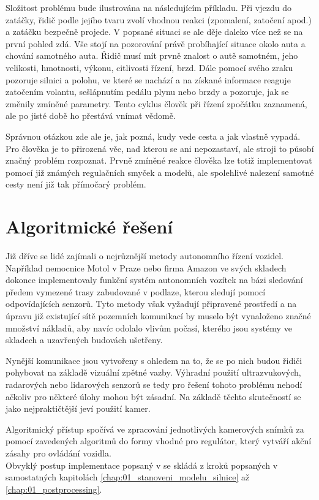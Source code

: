 \documentclass[czech, bc, kky, he, iso690numb]{fasthesis}
\begin{document}
        Složitost problému bude ilustrována na následujícím příkladu. Při vjezdu do zatáčky, řidič podle jejího tvaru zvolí vhodnou reakci (zpomalení, zatočení apod.) a zatáčku bezpečně projede. V popsané situaci se ale děje daleko více než se na první pohled zdá. Vše stojí na pozorování právě probíhající situace okolo auta a chování samotného auta. Řidič musí mít prvně znalost o autě samotném, jeho velikosti, hmotnosti, výkonu, citlivosti řízení, brzd. Dále pomocí svého zraku pozoruje silnici a polohu, ve které se nachází a na získané informace reaguje zatočením volantu, sešlápnutím pedálu plynu nebo brzdy a pozoruje, jak se změnily zmíněné parametry. Tento cyklus člověk při řízení zpočátku zaznamená, ale po jisté době ho přestává vnímat vědomě.
        
        Správnou otázkou zde ale je, jak pozná, kudy vede cesta a jak vlastně vypadá. Pro člověka je to přirozená věc, nad kterou se ani nepozastaví, ale stroji to působí značný problém rozpoznat. Prvně zmíněné reakce člověka lze totiž implementovat pomocí již známých regulačních smyček a modelů, ale spolehlivé nalezení samotné cesty není již tak přímočarý problém.
        
        \section{Algoritmické řešení}
            Již dříve se lidé zajímali o nejrůznější metody autonomního řízení vozidel. Například nemocnice Motol v Praze nebo firma Amazon ve svých skladech dokonce implementovaly funkční systém autonomních vozítek na bázi sledování předem vymezené trasy zabudované v podlaze, kterou sledují pomocí odpovídajících senzorů. Tyto metody však vyžadují připravené prostředí a na úpravu již existující sítě pozemních komunikací by muselo být vynaloženo značné množství nákladů, aby navíc odolalo vlivům počasí, kterého jsou systémy ve skladech a uzavřených budovách ušetřeny.
            
            Nynější komunikace jsou vytvořeny s ohledem na to, že se po nich budou řidiči pohybovat na základě vizuální zpětné vazby. Výhradní použití ultrazvukových, radarových nebo lidarových senzorů se tedy pro řešení tohoto problému nehodí ačkoliv pro některé úlohy mohou být zásadní. Na základě těchto skutečností se jako nejpraktičtější jeví použití kamer.
            
            Algoritmický přístup spočívá ve zpracování jednotlivých kamerových snímků za pomocí zavedených algoritmů do formy vhodné pro regulátor, který vytváří akční zásahy pro ovládání vozidla.\\
            Obvyklý postup implementace popsaný v \cite{VIOLET} se skládá z kroků popsaných v samostatných kapitolách \ref{chap:01_stanoveni_modelu_silnice} až \ref{chap:01_postprocessing}.\\
\end{document}

